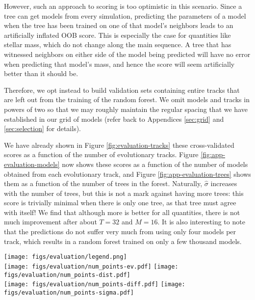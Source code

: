 \documentclass[twocolumn,twocolappendix]{aastex6}
\newif\ifref
\newcommand{\mb}[1]{\ifref\boldmath\textbf{#1}\unboldmath\else #1\fi}
\begin{document}
However, such an approach to scoring is too optimistic in this scenario. Since a tree can get models from every simulation, predicting the \mb{parameters} of a model when the tree has been trained on one of that model's neighbors leads to an artificially inflated OOB score. This is especially the case for quantities like stellar mass, which do not change along the main sequence. A tree that has witnessed neighbors on either side of the model being predicted will have no error when predicting that model's mass, and hence the score will seem artificially better than it should be. 

Therefore, we opt instead to build validation sets containing entire tracks that are left out from the training of the random forest. We omit models and tracks in powers of two so that we may roughly maintain the regular spacing that we have established in our grid of models (refer back to Appendices \ref{sec:grid} and \ref{sec:selection} for details). 

We have already shown in Figure \ref{fig:evaluation-tracks} these cross-validated scores as a function of the number of evolutionary tracks. Figure \ref{fig:app-evaluation-models} now shows these scores as a function of the number of models obtained from each evolutionary track, and Figure \ref{fig:app-evaluation-trees} shows them as a function of the number of trees in the forest. Naturally, $\hat\sigma$ increases with the number of trees, but this is not a mark against having more trees: this score is trivially minimal when there is only one tree, as that tree must agree with itself! We find that although more is better for all quantities,  there is not much improvement after about $T=32$ and $M=16$. It is also interesting to note that the predictions do not suffer very much from using only four models per track, which results in a random forest trained on only a few thousand models. 

\begin{figure*}
    \centering 
    \texttt{[image: figs/evaluation/legend.png]}\\
    \texttt{[image: figs/evaluation/num\_points-ev.pdf]}%
    \texttt{[image: figs/evaluation/num\_points-dist.pdf]}\\
    \texttt{[image: figs/evaluation/num\_points-diff.pdf]}%
    \texttt{[image: figs/evaluation/num\_points-sigma.pdf]}\\
    \caption{%
    Explained variance (top left), accuracy per precision distance (top right), normalized absolute error (bottom left), and normalized standard deviation of predictions (bottom right) for each stellar parameter as a function of the number of models per evolutionary track.} 
    \label{fig:app-evaluation-models}
\end{figure*}
\end{document}
